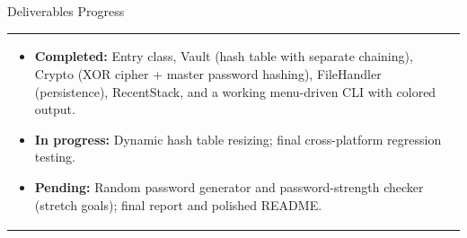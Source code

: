\documentclass[12pt,a4paper]{article}
\newcommand{\sectiontitle}[1]{%
    {\color{GEUBlue}
    \fontsize{18}{22}\selectfont #1}
}
\newcommand{\answerbox}[2][]{%
    \begin{tabularx}{\textwidth}{
        |>{\raggedright\arraybackslash}X|}
        \hline
        \parbox[t]{\dimexpr\linewidth-12pt\relax}{
            \vspace{5pt}
            \fontsize{11}{13}\selectfont #2
            \vspace{5pt}
        }\\
        \hline
    \end{tabularx}
}
\begin{document}
\vspace{0.65cm}

\sectiontitle{Deliverables Progress }

\vspace{0.05cm}


\vspace{0.25cm}

\answerbox{
\begin{itemize}[leftmargin=5mm, itemsep=2pt, topsep=2pt]
\item \textbf{Completed:} Entry class, Vault (hash table with separate chaining), Crypto (XOR cipher + master password hashing), FileHandler (persistence), RecentStack, and a working menu-driven CLI with colored output.
\item \textbf{In progress:} Dynamic hash table resizing; final cross-platform regression testing.
\item \textbf{Pending:} Random password generator and password-strength checker (stretch goals); final report and polished README.
\end{itemize}}
\end{document}
